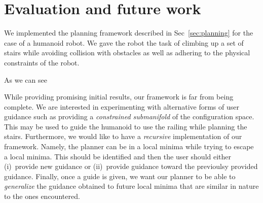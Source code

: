 \documentclass[conference]{IEEEtran}
\begin{document}
\section{Evaluation and future work}\label{sec:eval}
We implemented the planning framework described in Sec~\ref{sec:planning} for the case of a humanoid robot. We gave the robot the task of climbing up a set of stairs while avoiding collision with obstacles as well as adhering to the physical constraints of the robot.

As we can see 

While providing promising initial results, our framework is far from being complete.
We are interested in experimenting with alternative forms of user guidance such as providing a \emph{constrained submanifold} of the configuration space. This may be used to guide the humanoid to use the railing while planning the stairs.
Furthermore, we would like to have a \emph{recursive} implementation of our framework.
Namely, the planner can be in a local minima while trying to escape a local minima. This should be identified and then the user should either (i)~provide new guidance 
or 
(ii)~provide  guidance  toward the previoulsy provided guidance.
Finally, once a guide is given, we want our planner to be able to \emph{generalize} the guidance obtained to future local minima that are similar in nature to the ones encountered.


%


\end{document}
